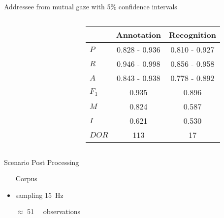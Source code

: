   \begin{frame}{Addressee from mutual gaze \tiny{with 5\% confidence intervals}}
    \begin{columns}[T] %
      \begin{column}{.5\textwidth}
        \begin{figure}[htb]
          \resizebox{\textwidth}{!}{%
            
          }
        \end{figure}
      \end{column}%
      \begin{column}{.5\textwidth}
        \begin{center}
        \begin{scriptsize}
          \begin{tabular}{l | c | c }
                    & Annotation & Recognition \\ \hline
            \(P\)   & 0.828 - 0.936 & 0.810 - 0.927  \\ 
            \(R\)   & 0.946 - 0.998 & 0.856 - 0.958 \\
            \(A\)   & 0.843 - 0.938 & 0.778 - 0.892 \\
            \(F_1\) & 0.935        & 0.896 \\
            \(M\)   & 0.824        & 0.587 \\
            \(I\)   & 0.621        & 0.530 \\
            \(DOR\) & 113          & 17 \\
           \end{tabular}
          \end{scriptsize}
        \end{center}
   \end{column}%
   \end{columns}
  \end{frame}
\begin{frame}{Scenario Post Processing}
  \centering
  \vspace{10pt}
  \footnotesize
  \begin{itemize}[label=-]
        \item[] Corpus
        \item sampling \SI{15}{\Hz}
        \item[\(\approx\)]  \SI{51}{\kilo\nothing} observations  
  \end{itemize}
\end{frame}
